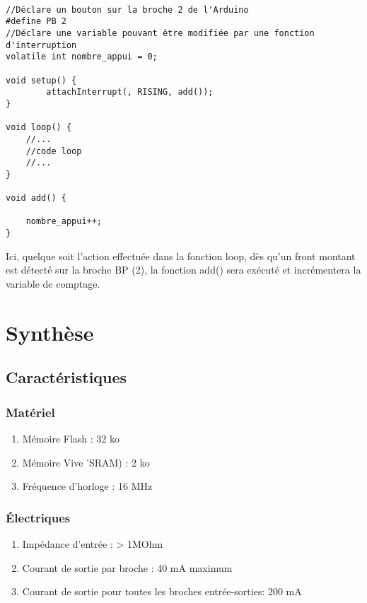 \documentclass[12pt]{report}
\begin{document}
\begin{verbatim}

//Déclare un bouton sur la broche 2 de l'Arduino
#define PB 2  						
//Déclare une variable pouvant être modifiée par une fonction d'interruption
volatile int nombre_appui = 0;  	

void setup() {
		attachInterrupt(, RISING, add());
}

void loop() {
	//...
	//code loop
	//...
}

void add() {
	
	nombre_appui++;
}

\end{verbatim}
Ici, quelque soit l'action effectuée dans la fonction loop, dès qu'un front montant est détecté sur la broche BP (2), la fonction add() sera exécuté et incrémentera la variable de comptage.







\chapter{Synthèse}

\section{Caractéristiques}

\subsection {Matériel}

\begin{enumerate}
\item Mémoire Flash : 32 ko
\item Mémoire Vive 'SRAM) : 2 ko 
\item Fréquence d'horloge : 16 MHz 
\end{enumerate}



\subsection {Électriques}

\begin{enumerate}
\item Impédance d'entrée : > 1MOhm
\item Courant de sortie par broche : 40 mA maximum
\item Courant de sortie pour toutes les broches entrée-sorties: 200 mA
\end{enumerate}
\end{document}
